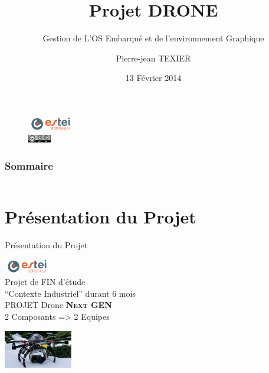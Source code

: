 \documentclass[11pt]{beamer}
\title[Equipe segment SOL : Chef de PROJET]{Projet DRONE}
\subtitle{Gestion de L'OS Embarqué et de l'environnement Graphique}
\institute{ Ecole Supérieure des Technologies Electronique Informatique Infographie  }
\author{Pierre-jean \textsc{TEXIER}}
\date{13 Février 2014}
\begin{document}
	\begin{frame}
	  \maketitle
		\begin{figure}
			\begin{center}
				\includegraphics[width=2cm]{common/estei.png}\\
				\includegraphics[width=1cm]{common/cc.png}
			\end{center}
		\end{figure}
	\end{frame}
		
	\begin{frame}
		\frametitle{Sommaire}
		\begin{columns}[t]
		\begin{column}{5cm}
		\tableofcontents[sections={1-4},hideallsubsections]
		\end{column}
		\begin{column}{5cm}
		\tableofcontents[sections={5-10},hideallsubsections]
		\end{column}
		\end{columns}
	 \end{frame}
	
	
 	\section{Présentation du Projet}
	\begin{frame}{Présentation du Projet}
	\begin{center}
	
	\includegraphics[width=2cm]{common/estei.png}\\
	Projet de FIN d'étude \\
	``Contexte Industriel'' durant 6 mois\\
	PROJET Drone \textbf{\textsc{Next GEN}}   \\     
	2 Composants => 2 Equipes  
	\begin{center}
	\includegraphics[width=3cm]{common/drone.png}
	\end{center}
	\end{center}
	\end{frame}
	
\end{document}
